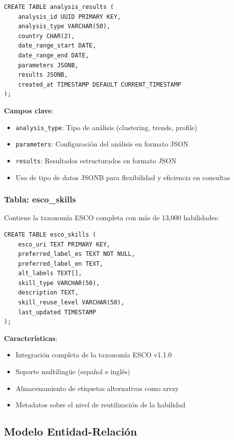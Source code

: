 \begin{verbatim}
CREATE TABLE analysis_results (
    analysis_id UUID PRIMARY KEY,
    analysis_type VARCHAR(50),
    country CHAR(2),
    date_range_start DATE,
    date_range_end DATE,
    parameters JSONB,
    results JSONB,
    created_at TIMESTAMP DEFAULT CURRENT_TIMESTAMP
);
\end{verbatim}

\textbf{Campos clave}:
\begin{itemize}
    \item \texttt{analysis\_type}: Tipo de análisis (clustering, trends, profile)
    \item \texttt{parameters}: Configuración del análisis en formato JSON
    \item \texttt{results}: Resultados estructurados en formato JSON
    \item Uso de tipo de datos JSONB para flexibilidad y eficiencia en consultas
\end{itemize}

\subsubsection{Tabla: esco\_skills}

Contiene la taxonomía ESCO completa con más de 13,000 habilidades:

\begin{verbatim}
CREATE TABLE esco_skills (
    esco_uri TEXT PRIMARY KEY,
    preferred_label_es TEXT NOT NULL,
    preferred_label_en TEXT,
    alt_labels TEXT[],
    skill_type VARCHAR(50),
    description TEXT,
    skill_reuse_level VARCHAR(50),
    last_updated TIMESTAMP
);
\end{verbatim}

\textbf{Características}:
\begin{itemize}
    \item Integración completa de la taxonomía ESCO v1.1.0
    \item Soporte multilingüe (español e inglés)
    \item Almacenamiento de etiquetas alternativas como array
    \item Metadatos sobre el nivel de reutilización de la habilidad
\end{itemize}

\subsection{Modelo Entidad-Relación}

